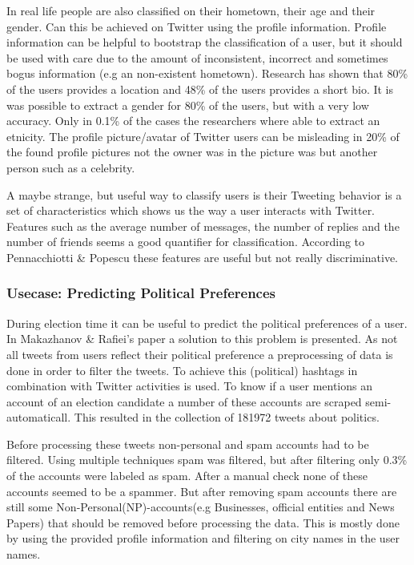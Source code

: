 \documentclass{article}
\begin{document}
In real life people are also classified on their hometown, their age and their gender. Can this be achieved on Twitter using the profile information.  Profile information can be helpful to bootstrap the classification of a user, but it should be used with care due to the amount of inconsistent, incorrect and sometimes bogus information (e.g an non-existent hometown). Research has shown that 80\% of the users provides a location and 48\% of the users provides a short bio. \cite{usermachine} It is was possible to extract a gender for 80\% of the users, but with a very low accuracy. Only in 0.1\% of the cases the researchers where able to extract an etnicity. The profile picture/avatar of Twitter users can be misleading in 20\% of the found profile pictures not the owner was in the picture was but another person such as a celebrity.  \cite{usermachine}

A maybe strange, but useful way to classify users is their   Tweeting behavior is a set of characteristics which shows us the way a user interacts with Twitter. Features such as the average number of messages, the number of replies and the number of friends seems a good quantifier for classification. According to Pennacchiotti \& Popescu these features are useful but not really discriminative. \cite{userclasst} 



\subsubsection*{Usecase: Predicting Political Preferences}


During election time it can be useful to predict the political preferences of a user. In Makazhanov \& Raﬁei's paper a solution to this problem is presented. As not all tweets from users reflect their political preference a preprocessing of data is done in order to filter the tweets. \cite{pol} To achieve this (political) hashtags in combination with Twitter activities is used. To know if a user mentions an account of an election candidate a number of these accounts are scraped semi-automaticall. This resulted in the collection of 181972 tweets about politics.\cite{pol}

Before processing these tweets non-personal and spam accounts had to be filtered. Using multiple techniques spam was filtered, but after filtering only 0.3\% of the accounts were labeled as spam. After a manual check none of these accounts seemed to be a spammer. But after removing spam accounts there are still some Non-Personal(NP)-accounts(e.g Businesses, official entities and News Papers)  that should be removed before processing the data. This is mostly done by using the provided profile information and filtering on city names in the user names.  \cite{pol}
\end{document}
